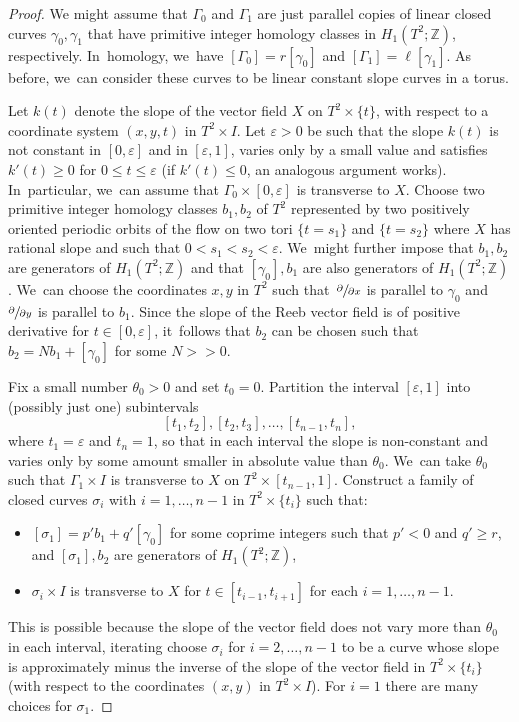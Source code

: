 \documentclass[JEP,XML,SOM,Unicode,NoEqCountersInSection,NoFloatCountersInSection,published]{cedram}
\newcommand{\spp}[2]{\sfrac{\partial#1}{\partial#2}}
\theoremstyle{definition}
\begin{document}
\begin{proof}
We might assume that $\Gamma_0$ and $\Gamma_1$ are just parallel copies of linear closed curves $\gamma_0, \gamma_1$ that have primitive integer homology classes in $H_1(T^2;\mathbb{Z})$, respectively. In~homology, we~have $[\Gamma_0]=r[\gamma_0]$ and $[\Gamma_1]=\ell[\gamma_1]$. As before, we~can consider these curves to be linear constant slope curves in a torus.

Let $k(t)$ denote the slope of the vector field $X$ on $T^2\times \{t\}$, with respect to a coordinate system $(x,y,t)$ in $T^2\times I$. Let $\varepsilon>0$ be such that the slope $k(t)$ is not constant in $[0,\varepsilon]$ and in $[\varepsilon, 1]$, varies only by a small value and satisfies $k'(t)\geq 0$ for $0\leq t\leq \varepsilon$ (if $k'(t)\leq 0$, an analogous argument works). In~particular, we~can assume that $\Gamma_0\times [0, \varepsilon]$ is transverse to $X$. Choose two primitive integer homology classes $b_1, b_2$ of $T^2$ represented by two positively oriented periodic orbits of the flow on two tori $\{t=s_1\}$ and $\{t=s_2\}$ where $X$ has rational slope and such that $0<s_1<s_2<\varepsilon$. We~might further impose that $b_1,b_2$ are generators of $H_1(T^2;\mathbb{Z})$ and that $[\gamma_0],b_1$ are also generators of $H_1(T^2;\mathbb{Z})$. We~can choose the coordinates $x,y$ in $T^2$ such that~$\spp{}{x}$ is parallel to $\gamma_0$ and $\spp{}{y}$ is parallel to $b_1$. Since the slope of the Reeb vector field is of positive derivative for $t\in [0,\varepsilon]$, it~follows that $b_2$ can be chosen such that $b_2=Nb_1+[\gamma_0]$ for some $N>>0$.

Fix a small number $\theta_0>0$ and set $t_0=0$. Partition the interval $[\varepsilon,1]$ into (possibly just one) subintervals
\[
[t_1,t_2], [t_2,t_3],\dots, [t_{n-1},t_n],
\]
where $t_1=\varepsilon$ and $t_n=1$, so that in each interval the slope is non-constant and varies only by some amount smaller in absolute value than $\theta_0$. We~can take $\theta_0$ such that $\Gamma_1\times I$ is transverse to $X$ on $T^2\times [t_{n-1},1]$. Construct a family of closed curves $\sigma_i$ with $i=1,\dots,n-1$ in $T^2\times \{t_i\}$ such that:
\begin{itemize}
\item
$[\sigma_1]=p'b_1+q'[\gamma_0]$ for some coprime integers such that $p'<0$ and $q'\geq r$, and $[\sigma_1],b_2$ are generators of $H_1(T^2;\mathbb{Z})$,
\item
$\sigma_i\times I$ is transverse to $X$ for $t\in[t_{i-1},t_{i+1}]$ for each $i=1,\dots,n-1$.
\end{itemize}
This is possible because the slope of the vector field does not vary more than $\theta_0$ in each interval, iterating choose $\sigma_i$ for $i=2,\dots,n-1$ to be a curve whose slope is approximately minus the inverse of the slope of the vector field in $T^2\times \{t_i\}$ (with respect to the coordinates $(x,y)$ in $T^2 \times I$). For $i=1$ there are many choices for $\sigma_1$.


\end{proof}
\end{document}
